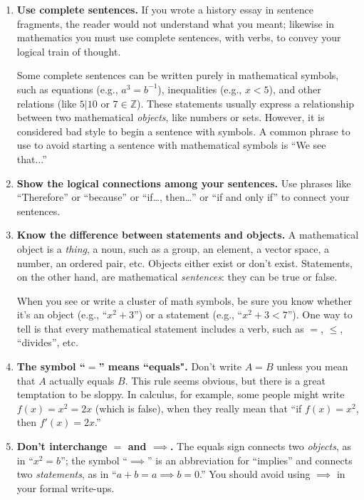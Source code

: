 \documentclass[11pt]{article}
\begin{document}
\begin{enumerate}
\item \textbf{Use complete sentences.}
        If you wrote a history essay in sentence fragments,
        the reader would not understand what you meant;
        likewise in mathematics you must use complete sentences, with verbs,
        to convey your logical train of thought.
        
        Some complete sentences can be written purely in mathematical symbols, 
        such as 
          equations (e.g., $a^3=b^{-1}$),
          inequalities (e.g., $x<5$),
          and other relations (like $5\big|10$ or $7\in\mathbb{Z}$).
        These statements usually express a relationship between two mathematical \emph{objects},
        like numbers or sets.  However, it is considered bad style to begin a sentence with symbols.  A common phrase to use to avoid starting a sentence with mathematical symbols is ``We see that...''

\item \textbf{Show the logical connections among your sentences.}
        Use phrases like ``Therefore'' or ``because'' or ``if\ldots, then\ldots''
        or ``if and only if'' to connect your sentences.
  
\item \textbf{Know the difference between statements and objects.}
        A mathematical object is a \emph{thing}, a noun,
        such as a group, an element, a vector space, a number, an ordered pair, etc.
        Objects either exist or don't exist.
        Statements, on the other hand, are mathematical \emph{sentences}:  they can be true or false.
        
        When you see or write a cluster of math symbols, be sure you know 
        whether it's an object (e.g., ``$x^2+3$'') or a statement (e.g., ``$x^2+3<7$'').
        One way to tell is that every mathematical statement includes a verb, such as
        $=$, $\leq$, ``divides'', etc.
        
\item \textbf{The symbol ``$=$'' means ``equals".}
        Don't write $A=B$ unless you mean that $A$ actually equals $B$.
        This rule seems obvious,
        but there is a great temptation to be sloppy.  In calculus, for example, some people might write $f(x)=x^{2}=2x$ (which is false), when they really mean that ``if $f(x)=x^{2}$, then $f'(x)=2x$.''

\item \textbf{Don't interchange ${=}$ and ${\implies}$.}
        The equals sign connects two \emph{objects}, as in ``$x^2=b$''; 
        the symbol ``$\implies$'' is an abbreviation for ``implies'' and connects two \emph{statements},
        as in ``$a+b=a \implies b=0$.''  You should avoid using $\implies$ in your formal write-ups.


\end{enumerate}
\end{document}
